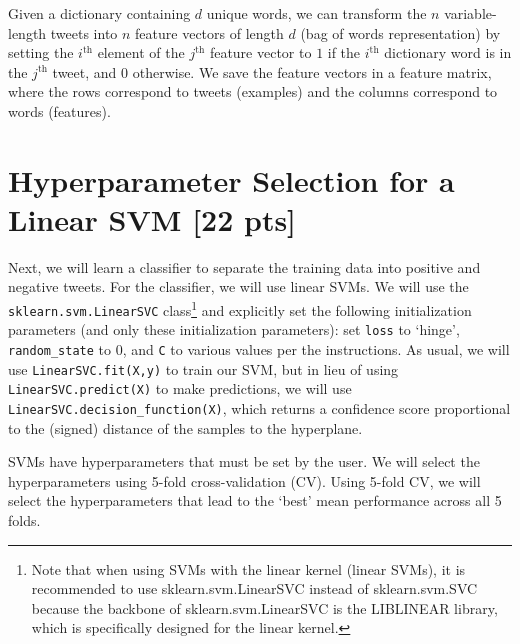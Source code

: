 \documentclass[11pt]{article}
\begin{document}
Given a dictionary containing $d$ unique words, we can transform the $n$ variable-length tweets into $n$ feature vectors of length $d$ (bag of words representation) by setting the $i^\textrm{th}$ element of the $j^\textrm{th}$ feature vector to $1$ if the $i^\textrm{th}$ dictionary word is in the $j^\textrm{th}$ tweet, and $0$ otherwise. We save the feature vectors in a feature matrix, where the rows correspond to tweets (examples) and the columns correspond to words (features).

\section{Hyperparameter Selection for a Linear SVM [22 pts]}\label{sec:linear}

Next, we will learn a classifier to separate the training data into positive and negative tweets. For the classifier, we will use linear SVMs. We will use the \verb|sklearn.svm.LinearSVC| class\footnote{Note that when using SVMs with the linear kernel (linear SVMs), it is recommended to use sklearn.svm.LinearSVC instead of sklearn.svm.SVC because the backbone of sklearn.svm.LinearSVC is the LIBLINEAR library, which is specifically designed for the linear kernel.} and explicitly set the following initialization parameters (and only these initialization parameters): set \verb|loss| to `hinge', \verb|random_state| to 0, and \verb|C| to various values per the instructions. As usual, we will use \verb|LinearSVC.fit(X,y)| to train our SVM, but in lieu of using \verb|LinearSVC.predict(X)| to make predictions, we will use \verb|LinearSVC.decision_function(X)|, which returns a confidence score proportional to the (signed) distance of the samples to the hyperplane.

SVMs have hyperparameters that must be set by the user. We will select the hyperparameters using 5-fold cross-validation (CV). Using 5-fold CV, we will select the hyperparameters that lead to the `best' mean performance across all 5 folds.
\end{document}
